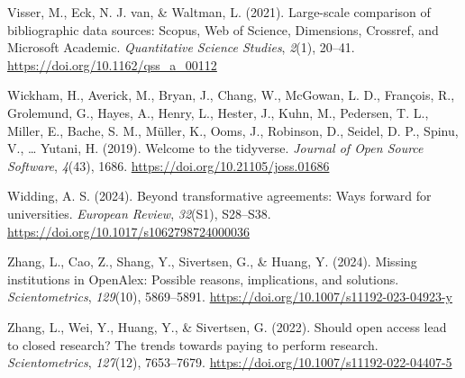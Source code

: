 \documentclass[a4paper,man,floatsintext,longtable,noextraspace,10pt]{apa6}
\newlength{\cslhangindent}
\newenvironment{CSLReferences}[2] %
{\begin{list}{}{%
  \setlength{\itemindent}{0pt}
  \setlength{\leftmargin}{0pt}
  \setlength{\parsep}{0pt}
  \ifodd #1
  \setlength{\leftmargin}{\cslhangindent}
  \setlength{\itemindent}{-1\cslhangindent}
  \fi
  \setlength{\itemsep}{#2\baselineskip}}}
{\end{list}}
\begin{document}
\begin{CSLReferences}{1}{0}
Visser, M., Eck, N. J. van, \& Waltman, L. (2021). Large-scale
comparison of bibliographic data sources: {Scopus, Web of Science,
Dimensions, Crossref, and Microsoft Academic}. \emph{Quantitative
Science Studies}, \emph{2}(1), 20--41.
\url{https://doi.org/10.1162/qss_a_00112}

Wickham, H., Averick, M., Bryan, J., Chang, W., McGowan, L. D.,
François, R., Grolemund, G., Hayes, A., Henry, L., Hester, J., Kuhn, M.,
Pedersen, T. L., Miller, E., Bache, S. M., Müller, K., Ooms, J.,
Robinson, D., Seidel, D. P., Spinu, V., \ldots{} Yutani, H. (2019).
Welcome to the {tidyverse}. \emph{Journal of Open Source Software},
\emph{4}(43), 1686. \url{https://doi.org/10.21105/joss.01686}

Widding, A. S. (2024). Beyond transformative agreements: Ways forward
for universities. \emph{European Review}, \emph{32}(S1), S28--S38.
\url{https://doi.org/10.1017/s1062798724000036}

Zhang, L., Cao, Z., Shang, Y., Sivertsen, G., \& Huang, Y. (2024).
Missing institutions in OpenAlex: Possible reasons, implications, and
solutions. \emph{Scientometrics}, \emph{129}(10), 5869--5891.
\url{https://doi.org/10.1007/s11192-023-04923-y}

Zhang, L., Wei, Y., Huang, Y., \& Sivertsen, G. (2022). Should open
access lead to closed research? The trends towards paying to perform
research. \emph{Scientometrics}, \emph{127}(12), 7653--7679.
\url{https://doi.org/10.1007/s11192-022-04407-5}

\end{CSLReferences}
\end{document}

